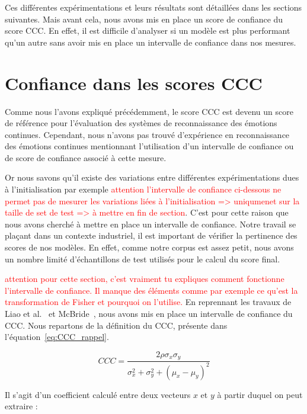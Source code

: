 Ces différentes expérimentations et leurs résultats sont détaillées dans les sections suivantes. Mais avant cela, nous avons mis en place un score de confiance du score CCC. En effet, il est difficile d'analyser si un modèle est plus performant qu'un autre sans avoir mis en place un intervalle de confiance dans nos mesures.

\section{Confiance dans les scores CCC}
Comme nous l'avons expliqué précédemment, le score CCC est devenu un score de référence pour l'évaluation des systèmes de reconnaissance des émotions continues. %
Cependant, nous n'avons pas trouvé d'expérience en reconnaissance des émotions continues  mentionnant l'utilisation d'un intervalle de confiance ou de score de confiance associé à cette mesure.

Or nous savons qu'il existe des variations entre différentes expérimentations dues à l'initialisation par exemple \textcolor{red}{attention l'intervalle de confiance ci-dessous ne permet pas de mesurer les variations liées à l'initialisation => uniqumenet sur la taille de set de test => à mettre en fin de section}. C'est pour cette raison que nous avons cherché à mettre en place un intervalle de confiance. Notre travail se plaçant dans un contexte industriel, il est important de vérifier la pertinence des scores de nos modèles. En effet, comme notre corpus est assez petit, nous avons un nombre limité d'échantillons de test utilisés pour le calcul du score final.

\textcolor{red}{attention pour cette section, c'est vraiment tu expliques comment fonctionne l'intervalle de confiance. Il manque des éléments comme par exemple ce qu'est la transformation de Fisher et pourquoi on l'utilise.} En reprennant les travaux de Liao et al.~\cite{Liao2000} et McBride~\cite{McBride2005}, nous avons mis en place un intervalle de confiance du CCC. Nous repartons de la définition du CCC, présente dans l'équation~\ref{eq:CCC_rappel}.

\begin{equation}
   CCC = \frac{2\rho\sigma_x\sigma_y}{\sigma_x^2 + \sigma_y^2 + (\mu_x - \mu_y)^2}
\label{eq:CCC_rappel}
\end{equation}

Il s'agit d'un coefficient calculé entre deux vecteurs $x$ et $y$ à partir duquel on peut extraire :

